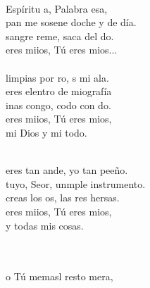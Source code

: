 \documentclass[12pt]{article}
\begin{document}
\begin{multicols*}{2}
\begin{cancion}%
	       \\
	Espíritu a, Palabra esa, \\
	pan me sosene doche y de día.\\
	sangre reme, saca del do.\\
	 eres miios, Tú eres mios...\\
	      \\
	limpias por ro, s mi ala. \\
	 eres elentro de miografía\\
	inas congo,  codo con do.\\
	 eres miios, Tú eres mios,\\
mi Dios y mi todo.\\\jump\\
	\begin{chorus}%
	 eres tan ande, yo  tan peeño. \\
	 tuyo, Seor, unmple instrumento.\\
	 creas los os, las res hersas.  \\
	 eres miios, Tú eres mios,\\
y todas mis cosas.\\
	\end{chorus}%
	\jump\\
	      \\
	o Tú memasl resto mera,\\

\end{cancion}
\end{multicols*}
\end{document}
